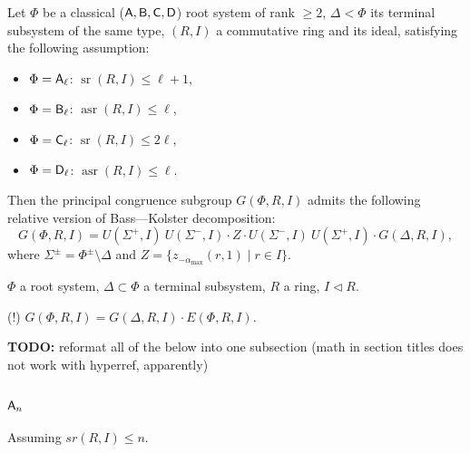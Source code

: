 \begin{thm}\label{thm:BassKolster}
Let $\Phi$ be a classical ($\mathsf{A},\mathsf{B},\mathsf{C},\mathsf{D}$) root system of rank $\geqslant2$, $\Delta<\Phi$ its terminal subsystem of the same type, $(R,I)$ a commutative ring and its ideal, satisfying the following assumption:
\begin{itemize}
\item $\Phi=\mathsf{A}_\ell$: $\operatorname{sr}(R,I)\leqslant\ell+1$,
\item $\Phi=\mathsf{B}_\ell$: $\operatorname{asr}(R,I)\leqslant\ell$,
\item $\Phi=\mathsf{C}_\ell$: $\operatorname{sr}(R,I)\leqslant2\ell$,
\item $\Phi=\mathsf{D}_\ell$: $\operatorname{asr}(R,I)\leqslant\ell$.
\end{itemize}
Then the principal congruence subgroup $G(\Phi,R,I)$ admits the following relative version of Bass---Kolster decomposition:
\[ G(\Phi,R,I)=U(\Sigma^+,I)\ U(\Sigma^-,I)\cdot Z\cdot U(\Sigma^-,I)\ U(\Sigma^+,I)\cdot G(\Delta,R,I), \]
where $\Sigma^\pm=\Phi^\pm\setminus\Delta$ and $Z=\{ z_{-\alpha_\mathrm{max}}(r,1)\mid r\in I \}$.
\end{thm}

$\Phi$ a root system, $\Delta\subset\Phi$ a terminal subsystem, $R$ a ring, $I\lhd R$.

(!) $G(\Phi,R,I)=G(\Delta,R,I)\cdot E(\Phi,R,I)$.

\textbf{TODO:} reformat all of the below into one subsection (math in section titles does not work with hyperref, apparently)

\subsection{$\mathsf{A}_n$}

Assuming $sr(R,I)\leqslant n$.


